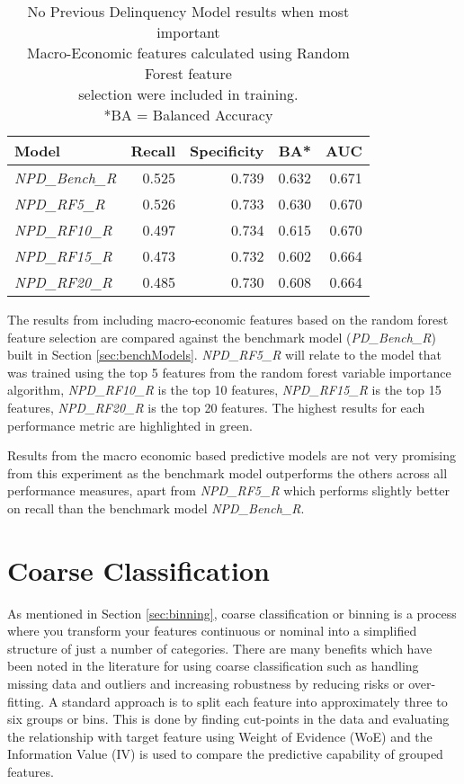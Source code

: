 \begin{table}[H]
\centering
\small
		\begin{tabular}{l  r r r r}
\hline
\textbf{Model}  & \textbf{Recall} & \textbf{Specificity} & \textbf{BA*} & \textbf{AUC}  \\ \hline
\textit{NPD\_Bench\_R} & 0.525 & \cellcolor{green!25}0.739 & \cellcolor{green!25}0.632 & \cellcolor{green!25}0.671   \\ \hline
\textit{NPD\_RF5\_R}  & \cellcolor{green!25}0.526 & 0.733 & 0.630 & 0.670   \\ 
\textit{NPD\_RF10\_R} & 0.497 & 0.734 & 0.615 & 0.670 \\ 
\textit{NPD\_RF15\_R} & 0.473 & 0.732 & 0.602 & 0.664  \\
\textit{NPD\_RF20\_R} & 0.485 & 0.730 & 0.608 & 0.664  \\\hline 
		\end{tabular}

	\caption{No Previous Delinquency Model results when most important\\
		Macro-Economic features calculated using Random Forest feature \\selection were included in training.
		\\ *BA = Balanced Accuracy}
	\label{table:RFNPDModelResults}
\end{table}

The results from including macro-economic features based on the random forest feature selection are compared against the benchmark model (\textit{PD\_Bench\_R}) built in Section \ref{sec:benchModels}. \textit{NPD\_RF5\_R} will relate to the model that was trained using the top 5 features from the random forest variable importance algorithm, \textit{NPD\_RF10\_R} is the top 10 features, \textit{NPD\_RF15\_R} is the top 15 features, \textit{NPD\_RF20\_R} is the top 20 features. The highest results for each performance metric are highlighted in green.

Results from the macro economic based predictive models are not very promising from this experiment as the benchmark model outperforms the others across all performance measures, apart from \textit{NPD\_RF5\_R} which performs slightly better on recall than the benchmark model \textit{NPD\_Bench\_R}.



\section{Coarse Classification}
As mentioned in Section \ref{sec:binning}, coarse classification or binning is a process where you transform your features continuous or nominal into a simplified structure of just a number of categories. There are many benefits which have been noted in the literature for using coarse classification such as handling missing data and outliers and increasing robustness by reducing risks or over-fitting. A standard approach is to split each feature into approximately three to six groups or bins. This is done by finding cut-points in the data and evaluating the relationship with target feature using Weight of Evidence (WoE) and the Information Value (IV) is used to compare the predictive capability of grouped features.


